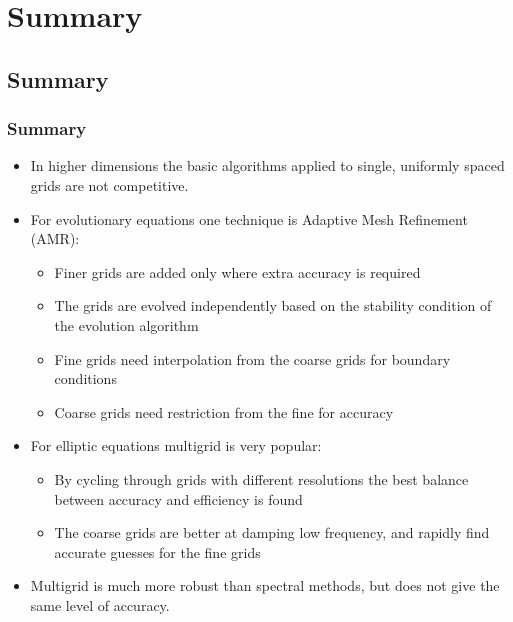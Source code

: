 \documentclass{beamer}
\begin{document}
\section{Summary}

\subsection{Summary}

\begin{frame}
  \frametitle{Summary}

  \begin{itemize}
  \item In higher dimensions the basic algorithms applied to single,
    uniformly spaced grids are not competitive.
  \item For evolutionary equations one technique is Adaptive Mesh
    Refinement (AMR):
    \begin{itemize}
    \item Finer grids are added only where extra accuracy is required
    \item The grids are evolved independently based on the stability
      condition of the evolution algorithm
    \item Fine grids need interpolation from the coarse grids for
      boundary conditions
    \item Coarse grids need restriction from the fine for accuracy
    \end{itemize}
  \item For elliptic equations multigrid is very popular:
    \begin{itemize}
    \item By cycling through grids with different resolutions the best
      balance between accuracy and efficiency is found
    \item The coarse grids are better at damping low frequency, and
      rapidly find accurate guesses for the fine grids
    \end{itemize}
  \item Multigrid is much more robust than spectral methods, but does
    not give the same level of accuracy.
  \end{itemize}

\end{frame}
\end{document}
